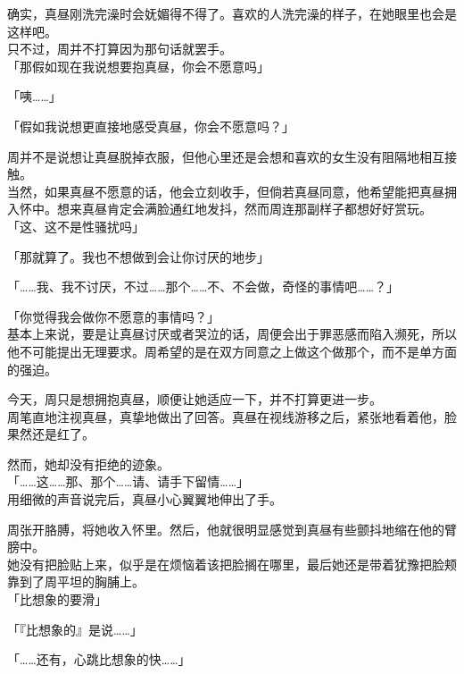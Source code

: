 确实，真昼刚洗完澡时会妩媚得不得了。喜欢的人洗完澡的样子，在她眼里也会是这样吧。\\

只不过，周并不打算因为那句话就罢手。\\

「那假如现在我说想要抱真昼，你会不愿意吗」

「咦……」

「假如我说想更直接地感受真昼，你会不愿意吗？」

周并不是说想让真昼脱掉衣服，但他心里还是会想和喜欢的女生没有阻隔地相互接触。\\

当然，如果真昼不愿意的话，他会立刻收手，但倘若真昼同意，他希望能把真昼拥入怀中。想来真昼肯定会满脸通红地发抖，然而周连那副样子都想好好赏玩。\\

「这、这不是性骚扰吗」

「那就算了。我也不想做到会让你讨厌的地步」

「……我、我不讨厌，不过……那个……不、不会做，奇怪的事情吧……？」

「你觉得我会做你不愿意的事情吗？」\\

基本上来说，要是让真昼讨厌或者哭泣的话，周便会出于罪恶感而陷入濒死，所以他不可能提出无理要求。周希望的是在双方同意之上做这个做那个，而不是单方面的强迫。

今天，周只是想拥抱真昼，顺便让她适应一下，并不打算更进一步。\\

周笔直地注视真昼，真挚地做出了回答。真昼在视线游移之后，紧张地看着他，脸果然还是红了。

然而，她却没有拒绝的迹象。\\

「……这……那、那个……请、请手下留情……」\\

用细微的声音说完后，真昼小心翼翼地伸出了手。

周张开胳膊，将她收入怀里。然后，他就很明显感觉到真昼有些颤抖地缩在他的臂膀中。\\

她没有把脸贴上来，似乎是在烦恼着该把脸搁在哪里，最后她还是带着犹豫把脸颊靠到了周平坦的胸脯上。\\

「比想象的要滑」

「『比想象的』是说……」

「……还有，心跳比想象的快……」\\


